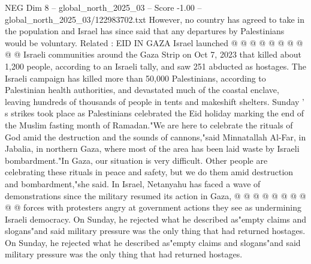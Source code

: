 \begin{textsample}{NEG Dim 8 – global\_north\_2025\_03 – Score -1.00 – global\_north\_2025\_03/122983702.txt}
However, no country has agreed to take in the population and Israel has since said that any departures by Palestinians would be voluntary.
Related : EID IN GAZA Israel launched @ @ @ @ @ @ @ @ @ @ Israeli communities around the Gaza Strip on Oct 7, 2023 that killed about 1,200 people, according to an Israeli tally, and saw 251 abducted as hostages.
The Israeli campaign has killed more than 50,000 Palestinians, according to Palestinian health authorities, and devastated much of the coastal enclave, leaving hundreds of thousands of people in tents and makeshift shelters.
Sunday ' s strikes took place as Palestinians celebrated the Eid holiday marking the end of the Muslim fasting month of Ramadan."We are here to celebrate the rituals of God amid the destruction and the sounds of cannons,"said Minnatallah Al-Far, in Jabalia, in northern Gaza, where most of the area has been laid waste by Israeli bombardment."In Gaza, our situation is very difficult.
Other people are celebrating these rituals in peace and safety, but we do them amid destruction and bombardment,"she said.
In Israel, Netanyahu has faced a wave of demonstrations since the military resumed its action in Gaza, @ @ @ @ @ @ @ @ @ @ forces with protesters angry at government actions they see as undermining Israeli democracy.
On Sunday, he rejected what he described as"empty claims and slogans"and said military pressure was the only thing that had returned hostages.
On Sunday, he rejected what he described as"empty claims and slogans"and said military pressure was the only thing that had returned hostages.

\end{textsample}
